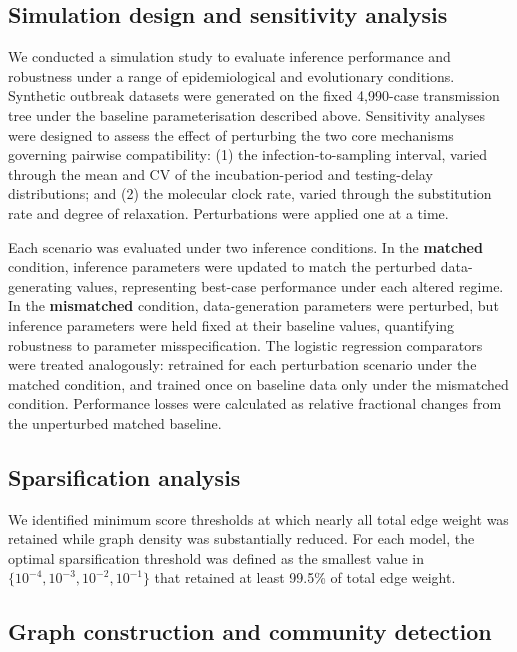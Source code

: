 \documentclass[10pt,letterpaper]{article}
\begin{document}
\subsection*{Simulation design and sensitivity analysis}

We conducted a simulation study to evaluate inference performance and robustness under a range of epidemiological and evolutionary conditions. Synthetic outbreak datasets were generated on the fixed 4{,}990-case transmission tree under the baseline parameterisation described above. Sensitivity analyses were designed to assess the effect of perturbing the two core mechanisms governing pairwise compatibility: (1) the infection-to-sampling interval, varied through the mean and CV of the incubation-period and testing-delay distributions; and (2) the molecular clock rate, varied through the substitution rate and degree of relaxation. Perturbations were applied one at a time.

Each scenario was evaluated under two inference conditions. In the \textbf{matched} condition, inference parameters were updated to match the perturbed data-generating values, representing best-case performance under each altered regime. In the \textbf{mismatched} condition, data-generation parameters were perturbed, but inference parameters were held fixed at their baseline values, quantifying robustness to parameter misspecification. The logistic regression comparators were treated analogously: retrained for each perturbation scenario under the matched condition, and trained once on baseline data only under the mismatched condition. Performance losses were calculated as relative fractional changes from the unperturbed matched baseline.

\subsection*{Sparsification analysis}

We identified minimum score thresholds at which nearly all total edge weight was retained while graph density was substantially reduced. For each model, the optimal sparsification threshold was defined as the smallest value in $\{10^{-4}, 10^{-3}, 10^{-2}, 10^{-1}\}$ that retained at least 99.5\% of total edge weight.

\subsection*{Graph construction and community detection}
\end{document}
